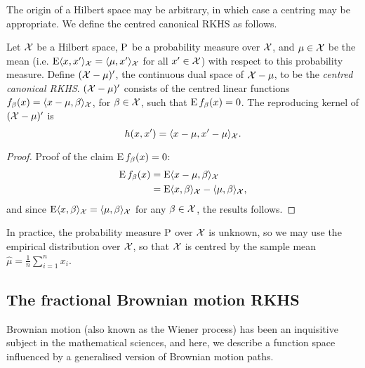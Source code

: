 \documentclass[a4paper,showframe,11pt,draft]{report}
\begin{document}
The origin of a Hilbert space may be arbitrary, in which case a centring may be appropriate.
We define the centred canonical RKHS as follows.

\begin{definition}
  Let ${\mathcal X}$ be a Hilbert space, $\operatorname{P}$ be a probability measure over ${\mathcal X}$, and $\mu\in{\mathcal X}$ be the mean (i.e. $\operatorname{E}\langle x,x'\rangle_{{\mathcal X}}  = \langle\mu,x'\rangle_{{\mathcal X}}$ for all $x' \in {\mathcal X}$) with respect to this probability measure.
  Define $({\mathcal X} - \mu)'$, the continuous dual space of ${\mathcal X} - \mu$, to be the \emph{centred canonical RKHS}.
  $({\mathcal X} - \mu)'$ consists of the centred linear functions $f_\beta(x)=\langle x-\mu,\beta\rangle_{\mathcal X}$, for $\beta\in{\mathcal X}$, such that $\operatorname{E} f_\beta(x) = 0$.
  The reproducing kernel of $({\mathcal X} - \mu)'$ is
  \[
    h(x,x') = \langle x-\mu,x'-\mu\rangle_{\mathcal X}.
  \]
\end{definition}

\begin{proof}
  Proof of the claim $\operatorname{E} f_\beta(x) = 0$:
  \begin{align*}
    \operatorname{E} f_\beta(x) 
    &= \operatorname{E} \langle x-\mu,\beta\rangle_{\mathcal X} \\
    &= \operatorname{E} \langle x,\beta\rangle_{\mathcal X} - \langle\mu,\beta\rangle_{\mathcal X},
  \end{align*}
  and since $\operatorname{E} \langle x,\beta\rangle_{\mathcal X} = \langle\mu,\beta\rangle_{\mathcal X}$ for any $\beta\in{\mathcal X}$, the results follows.
\end{proof}

\begin{remark}
  In practice, the probability measure $\operatorname{P}$ over ${\mathcal X}$ is unknown, so we may use the empirical distribution over ${\mathcal X}$, so that ${\mathcal X}$ is centred by the sample mean $\hat\mu = \frac{1}{n}\sum_{i=1}^n x_i$.  
\end{remark}


\subsection{The fractional Brownian motion RKHS}

Brownian motion (also known as the Wiener process) has been an inquisitive subject in the mathematical sciences, and here, we describe a function space influenced by a generalised version of Brownian motion paths.
\end{document}
